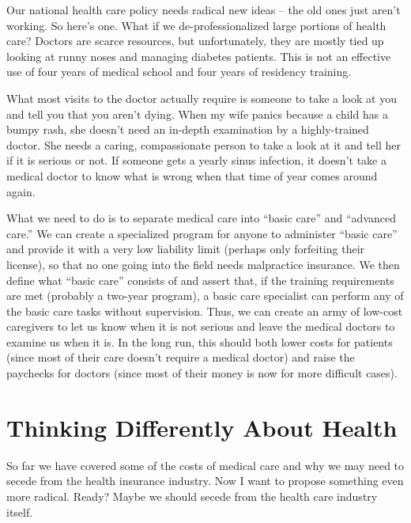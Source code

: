 \begin{policynote}
Our national health
care policy needs radical new ideas – the old ones just
aren't working.  So here's one.  What
if we
de-professionalized
large portions of
health care? Doctors
are scarce resources, but unfortunately, they are mostly tied up
looking at runny noses and managing diabetes patients. This is not an
effective use of four years of medical school and four years of
residency training.

What most visits to the doctor actually require is someone to take a
look at you and tell you that you aren't dying. When
my wife panics because a child has a bumpy rash, she
doesn't need an in-depth examination by a
highly-trained doctor. She needs a caring, compassionate person to take
a look at it and tell her if it is serious or not. If someone gets a
yearly sinus infection, it doesn't take a medical
doctor to know what is wrong when that time of year comes around again.

What we need to do is to separate medical care into ``basic
care'' and ``advanced care.'' We
can create a specialized program for anyone to administer
``basic care'' and provide it with a very low
liability limit (perhaps only forfeiting their license), so that no one
going into the field needs malpractice insurance. We then define what
``basic care'' consists of and assert that,
if the training requirements are met (probably a two-year program), a
basic care specialist can perform any of the basic care tasks without
supervision. Thus, we can create an army of low-cost caregivers to let
us know when it is not serious and leave the medical doctors to examine
us when it is. In the long run, this should both lower costs for
patients (since most of their care doesn't require a
medical doctor) and raise the paychecks for doctors (since most of
their money is now for more difficult cases).
\end{policynote}

\section{Thinking Differently About Health}

So far we have covered some of the costs of medical care and why we may
need to secede from the health insurance industry. Now I want to
propose something
even more
radical. Ready? Maybe
we should secede from the health care industry itself.

